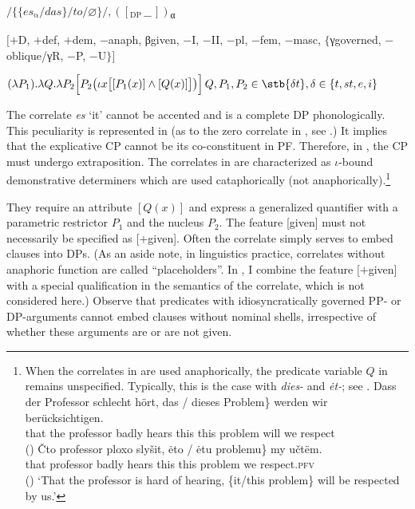 \documentclass[output=paper]{langscibook}
\begin{document}
\ea\label{ex:zimmermann:15}
    \ea\label{ex:zimmermann:15a}
    $/\big\{\{es_{\text{α}}/das\}/to/\varnothing\big\}/, ([_\textrm{DP} \, \_\_ \, ])$\textsubscript{α}

    \ex\label{ex:zimmermann:15b}
    $\lbrack+$D, $+$def, $+$dem, $-$anaph, βgiven, $-$I, $-$II, $-$pl, $-$fem, $-$masc, \newline $\lbrace$γgoverned, $-$oblique/γR, $-$P, $-$U$\rbrace\rbrack$

    \ex\label{ex:zimmermann:15c}
    $(\lambda P_1) . \lambda Q . \lambda P_2 \Big[P_2\big(\iota x \big[[P_1 (x)] \wedge [Q (x)]\big]\big)\Big]\,Q, P_1, P_2 \in \stb{\delta t}, {\delta} \in \{t, st, e, i\}$
\z\z

\noindent The correlate \textit{es} `it' cannot be accented and is a complete DP phonologically. This peculiarity is represented in  (as to the zero correlate in , see .) It implies that the explicative CP cannot be its co-constituent in PF. Therefore, in , the CP must undergo extraposition. The correlates in  are characterized as $\iota$-bound demonstrative determiners which are used cataphorically (not anaphorically).\footnote{When the correlates in  are used anaphorically, the predicate variable $Q$ in  remains unspecified. Typically, this is the case with  \textit{dies-} and  \textit{ėt-}; see .
        \ea\label{ex:zimmermann:fn20}
            \ea \gll Dass der Professor schlecht hört, \minsp{\{} das / dieses Problem\} werden wir berücksichtigen. \\
            that the professor badly hears {} this {} this problem will we respect\\ \hfill ()
            \ex \gll Čto professor ploxo slyšit, \minsp{\{} ėto / ėtu problemu\} my učtëm.\\
            that professor badly hears {} this {} this problem we respect.\textsc{pfv}\\ \hfill ()
            \z
            \glt `That the professor is hard of hearing, \{it/this problem\} will be respected by us.'
        \z}

They require an attribute $[Q (x)]$ and express a generalized quantifier with a parametric restrictor $P_1$ and the nucleus $P_2$. The feature [given] must not necessarily be specified as [$+$given]. Often the correlate simply serves to embed clauses into DPs. (As an aside note, in  linguistics practice, correlates without anaphoric function are called ``placeholders''. In \citet{Zimmermann2019c}, I combine the feature [$+$given] with a special qualification in the semantics of the correlate, which is not considered here.) Observe that predicates with idiosyncratically governed PP- or DP-arguments cannot embed clauses without nominal shells, irrespective of whether these arguments are or are not given.
\end{document}
